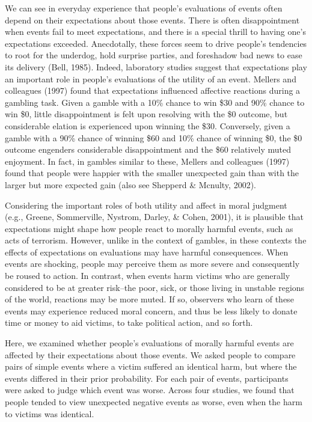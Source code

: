 \documentclass[10pt, letterpaper]{article}
\begin{document}
We can see in everyday experience that people's evaluations of events
often depend on their expectations about those events. There is often
disappointment when events fail to meet expectations, and there is a
special thrill to having one's expectations exceeded. Anecdotally, these
forces seem to drive people's tendencies to root for the underdog, hold
surprise parties, and foreshadow bad news to ease its delivery (Bell,
1985). Indeed, laboratory studies suggest that expectations play an
important role in people's evaluations of the utility of an event.
Mellers and colleagues (1997) found that expectations influenced
affective reactions during a gambling task. Given a gamble with a 10\%
chance to win \$30 and 90\% chance to win \$0, little disappointment is
felt upon resolving with the \$0 outcome, but considerable elation is
experienced upon winning the \$30. Conversely, given a gamble with a
90\% chance of winning \$60 and 10\% chance of winning \$0, the \$0
outcome engenders considerable disappointment and the \$60 relatively
muted enjoyment. In fact, in gambles similar to these, Mellers and
colleagues (1997) found that people were happier with the smaller
unexpected gain than with the larger but more expected gain (also see
Shepperd \& Mcnulty, 2002).

Considering the important roles of both utility and affect in moral
judgment (e.g., Greene, Sommerville, Nystrom, Darley, \& Cohen, 2001),
it is plausible that expectations might shape how people react to
morally harmful events, such as acts of terrorism. However, unlike in
the context of gambles, in these contexts the effects of expectations on
evaluations may have harmful consequences. When events are shocking,
people may perceive them as more severe and consequently be roused to
action. In contrast, when events harm victims who are generally
considered to be at greater risk--the poor, sick, or those living in
unstable regions of the world, reactions may be more muted. If so,
observers who learn of these events may experience reduced moral
concern, and thus be less likely to donate time or money to aid victims,
to take political action, and so forth.

Here, we examined whether people's evaluations of morally harmful events
are affected by their expectations about those events. We asked people
to compare pairs of simple events where a victim suffered an identical
harm, but where the events differed in their prior probability. For each
pair of events, participants were asked to judge which event was worse.
Across four studies, we found that people tended to view unexpected
negative events as worse, even when the harm to victims was identical.
\end{document}
